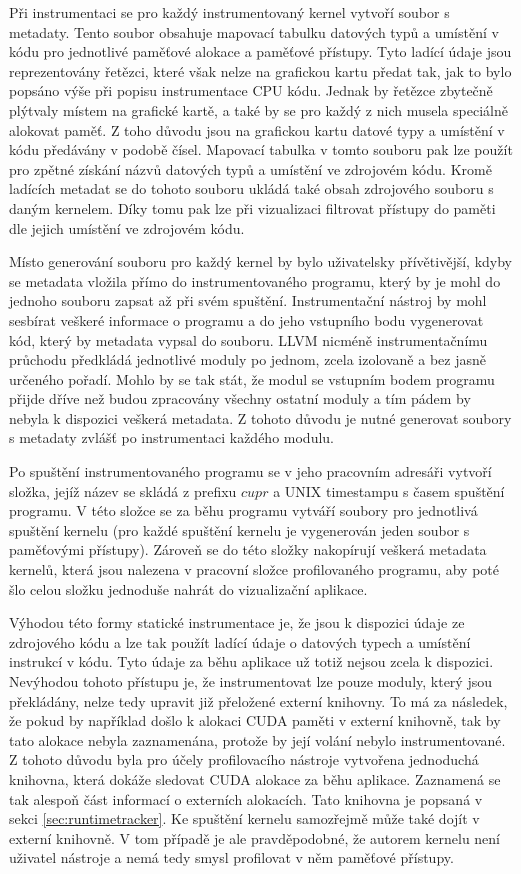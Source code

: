 Při instrumentaci se pro každý instrumentovaný kernel vytvoří soubor s metadaty. Tento soubor obsahuje mapovací tabulku datových typů a umístění v kódu pro jednotlivé paměťové alokace a paměťové přístupy. Tyto ladící údaje jsou reprezentovány řetězci, které však nelze na grafickou kartu předat tak, jak to bylo popsáno výše při popisu instrumentace CPU kódu. Jednak by řetězce zbytečně plýtvaly místem na grafické kartě, a také by se pro každý z nich musela speciálně alokovat paměť. Z toho důvodu jsou na grafickou kartu datové typy a umístění v kódu předávány v podobě čísel. Mapovací tabulka v tomto souboru pak lze použít pro zpětné získání názvů datových typů a umístění ve zdrojovém kódu. Kromě ladících metadat se do tohoto souboru ukládá také obsah zdrojového souboru s daným kernelem. Díky tomu pak lze při vizualizaci filtrovat přístupy do paměti dle jejich umístění ve zdrojovém kódu.
    
Místo generování souboru pro každý kernel by bylo uživatelsky přívětivější, kdyby se metadata vložila přímo do instrumentovaného programu, který by je mohl do jednoho souboru zapsat až při svém spuštění. Instrumentační nástroj by mohl sesbírat veškeré informace o programu a do jeho vstupního bodu vygenerovat kód, který by metadata vypsal do souboru. LLVM nicméně instrumentačnímu průchodu předkládá jednotlivé moduly po jednom, zcela izolovaně a bez jasně určeného pořadí. Mohlo by se tak stát, že modul se vstupním bodem programu přijde dříve než budou zpracovány všechny ostatní moduly a tím pádem by nebyla k dispozici veškerá metadata. Z tohoto důvodu je nutné generovat soubory s metadaty zvlášť po instrumentaci každého modulu.

Po spuštění instrumentovaného programu se v jeho pracovním adresáři vytvoří složka, jejíž název se skládá z prefixu $cupr$ a UNIX timestampu s časem spuštění programu. V této složce se za běhu programu vytváří soubory pro jednotlivá spuštění kernelu (pro každé spuštění kernelu je vygenerován jeden soubor s paměťovými přístupy). Zároveň se do této složky nakopírují veškerá metadata kernelů, která jsou nalezena v pracovní složce profilovaného programu, aby poté šlo celou složku jednoduše nahrát do vizualizační aplikace.  

Výhodou této formy statické instrumentace je, že jsou k dispozici údaje ze zdrojového kódu a lze tak použít ladící údaje o datových typech a umístění instrukcí v kódu. Tyto údaje za běhu aplikace už totiž nejsou zcela k dispozici. Nevýhodou tohoto přístupu je, že instrumentovat lze pouze moduly, který jsou překládány, nelze tedy upravit již přeložené externí knihovny. To má za následek, že pokud by například došlo k alokaci CUDA paměti v externí knihovně, tak by tato alokace nebyla zaznamenána, protože by její volání nebylo instrumentované. Z tohoto důvodu byla pro účely profilovacího nástroje vytvořena jednoduchá knihovna, která dokáže sledovat CUDA alokace za běhu aplikace. Zaznamená se tak alespoň část informací o externích alokacích. Tato knihovna je popsaná v sekci \ref{sec:runtimetracker}. Ke spuštění kernelu samozřejmě může také dojít v externí knihovně. V tom případě je ale pravděpodobné, že autorem kernelu není uživatel nástroje a nemá tedy smysl profilovat v něm paměťové přístupy.
    
